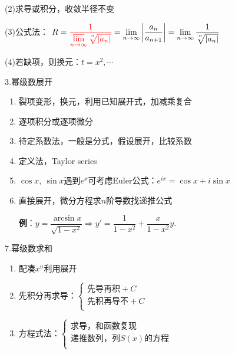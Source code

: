 \documentclass[UTF8]{ctexart}
\newcommand\no{\noindent}
\newcommand\dis{\displaystyle}
\newcommand\limn{\dis\lim\limits_{n\to\infty}}
\begin{document}
\begin{spacing}{2}
\vspace{0.2cm}

(2)求导或积分，收敛半径不变

(3)公式法：
$R=\textcolor[rgb]{1,0,0}{\dis\dfrac{1}{\varlimsup\limits_{n\to\infty}\sqrt[^n\!]{|a_n|}}}
=\limn\left|\dfrac{a_n}{a_{n+1}}\right|
=\limn\dfrac{1}{\sqrt[^n\!]{|a_n|}}$

\vspace{0.2cm}

(4)若缺项，则换元：$t=x^2,\cdots$

\no3.幂级数展开

\begin{enumerate}[itemindent=1.4em, label=(\arabic*)]

\item 裂项变形，换元，利用已知展开式，加减乘复合

\item 逐项积分或逐项微分

\item 待定系数法，一般是分式，假设展开，比较系数

\item 定义法，Taylor series

\item $\cos x,\ \sin x$遇到$e^x$可考虑Euler公式：$e^{ix}=\cos x+i\sin x$

\item 直接展开，微分方程求$n$阶导数找递推公式

\textbf{例}：$y=\dfrac{\arcsin x}{\sqrt{1-x^2}}\Longrightarrow
y'=\dfrac{1}{1-x^2}+\dfrac{x}{1-x^2}y.$

\end{enumerate}

\no7.幂级数求和

\begin{enumerate}[itemindent=1.4em, label=(\arabic*)]

\item 配凑$x^n$利用展开

\item 先积分再求导：$\left\{\begin{array}{l}
\text{先导再积}+C\\
\text{先积再导不}+C\\
\end{array}\right.$

\item 方程式法：$\left\{\begin{array}{l}
\text{求导，和函数复现}\\
\text{递推数列，列}S(x)\text{的方程}\\
\end{array}\right.$


\end{enumerate}
\end{spacing}
\end{document}
